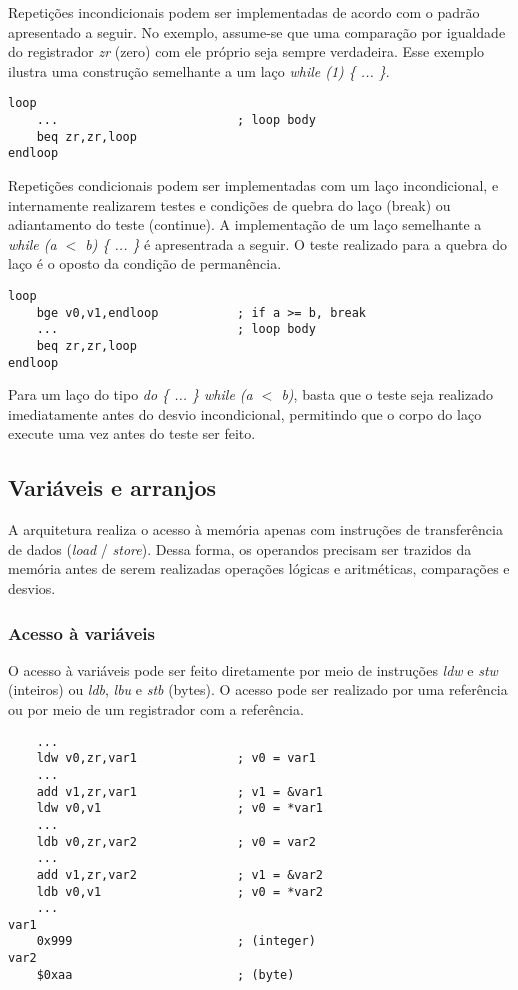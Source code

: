 \documentclass[11pt,a4paper]{report}
\begin{document}
Repetições incondicionais podem ser implementadas de acordo com o padrão
apresentado a seguir. No exemplo, assume-se que uma comparação por 
igualdade do registrador \textit{zr} (zero) com ele próprio seja sempre
verdadeira. Esse exemplo ilustra uma construção semelhante a um laço
\textit{while (1) \{ ... \}}.

\begin{verbatim}
loop
    ...                         ; loop body
    beq zr,zr,loop
endloop
\end{verbatim}

Repetições condicionais podem ser implementadas com um laço incondicional,
e internamente realizarem testes e condições de quebra do laço (break)
ou adiantamento do teste (continue). A implementação de um laço semelhante
a \textit{while (a $<$ b) \{ ... \}} é apresentrada a seguir. O teste
realizado para a quebra do laço é o oposto da condição de permanência.

\begin{verbatim}
loop
    bge v0,v1,endloop           ; if a >= b, break
    ...                         ; loop body
    beq zr,zr,loop
endloop
\end{verbatim}

Para um laço do tipo \textit{do \{ ... \} while (a $<$ b)}, basta que
o teste seja realizado imediatamente antes do desvio incondicional,
permitindo que o corpo do laço execute uma vez antes do teste ser feito.


\subsection{Variáveis e arranjos}

A arquitetura realiza o acesso à memória apenas com instruções de
transferência de dados (\textit{load} / \textit{store}). Dessa forma,
os operandos precisam ser trazidos da memória antes de serem realizadas
operações lógicas e aritméticas, comparações e desvios.

\subsubsection{Acesso à variáveis}

O acesso à variáveis pode ser feito diretamente por meio de instruções
\textit{ldw} e \textit{stw} (inteiros) ou \textit{ldb}, \textit{lbu} e
\textit{stb} (bytes). O acesso pode ser realizado por uma referência
ou por meio de um registrador com a referência.

\begin{verbatim}
    ...
    ldw v0,zr,var1              ; v0 = var1
    ...
    add v1,zr,var1              ; v1 = &var1
    ldw v0,v1                   ; v0 = *var1
    ...
    ldb v0,zr,var2              ; v0 = var2
    ...
    add v1,zr,var2              ; v1 = &var2
    ldb v0,v1                   ; v0 = *var2
    ...
var1
    0x999                       ; (integer)
var2
    $0xaa                       ; (byte)
\end{verbatim}
\end{document}
